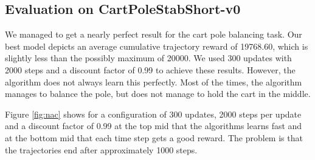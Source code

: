 \subsection{Evaluation on CartPoleStabShort-v0}

We managed to get a nearly perfect result for the cart pole balancing task. Our best model depicts an average cumulative trajectory reward of 19768.60, which is slightly less than the possibly maximum of 20000. We used 300 updates with 2000 steps and a discount factor of 0.99 to achieve these results. However, the algorithm does not always learn this perfectly. Most of the times, the algorithm manages to balance the pole, but does not manage to hold the cart in the middle. 

Figure \ref{fig:nac} shows for a configuration of 300 updates, 2000 steps per update and a discount factor of 0.99  at the top mid that the algorithms learns fast and at the bottom mid that each time step gets a good reward. The problem is that the trajectories end after approximately 1000 steps.

